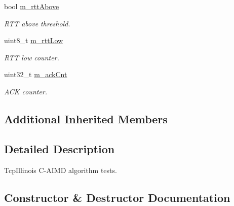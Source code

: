 \begin{DoxyCompactItemize}
bool \hyperlink{classTcpIllinoisTest_aa1955bfc6f0c531c5340f656cfbcebf0}{m\+\_\+rtt\+Above}
\begin{DoxyCompactList}\small\item\em R\+TT above threshold. \end{DoxyCompactList}\item 
uint8\+\_\+t \hyperlink{classTcpIllinoisTest_a778939c4eb1decc6b08488b49edf517c}{m\+\_\+rtt\+Low}
\begin{DoxyCompactList}\small\item\em R\+TT low counter. \end{DoxyCompactList}\item 
uint32\+\_\+t \hyperlink{classTcpIllinoisTest_a4683d4ed2bd3ec0b78e89ba8677fbcac}{m\+\_\+ack\+Cnt}
\begin{DoxyCompactList}\small\item\em A\+CK counter. \end{DoxyCompactList}\end{DoxyCompactItemize}
\subsection*{Additional Inherited Members}


\subsection{Detailed Description}
Tcp\+Illinois C-\/\+A\+I\+MD algorithm tests. 

\subsection{Constructor \& Destructor Documentation}
